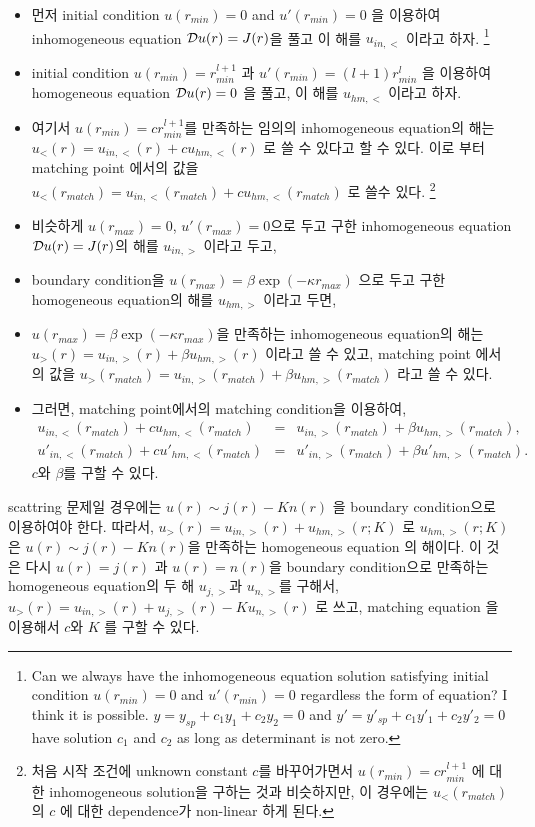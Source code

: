 \documentclass[10pt]{book}
\newcommand{\bea}{\begin{eqnarray}}
\newcommand{\eea}{\end{eqnarray}}
\newcommand{\no}{\nonumber \\}
\begin{document}
\begin{itemize}
\item  먼저 initial condition $u(r_{min})=0$ and $u'(r_{min})=0$ 을 이용하여 
       inhomogeneous equation ${\cal D}u(r)=J(r)$을 풀고 이 해를 $u_{in,<}$ 이라고 하자. 
       \footnote{ Can we always have the inhomogeneous equation solution 
       satisfying initial condition $u(r_{min})=0$ and $u'(r_{min})=0$ regardless 
       the form of equation? I think it is possible. 
       $y=y_{sp}+c_1 y_1+c_2 y_2=0$ and 
       $y'=y'_{sp}+c_1 y'_1+c_2 y'_2=0$ have solution $c_1$ and $c_2$
       as long as determinant is not zero.       
       } 
\item initial condition $u(r_{min})=r_{min}^{l+1}$ 과 $u'(r_{min})=(l+1)r_{min}^l$ 을 
      이용하여 homogeneous equation ${\cal D}u(r)=0$ 을 풀고, 이 해를 
      $u_{hm,<}$ 이라고 하자. 
\item 여기서 $u(r_{min})= c r_{min}^{l+1}$를 만족하는 임의의 inhomogeneous equation의 해는 
      $u_{<}(r)=u_{in,<}(r)+c u_{hm,<}(r)$ 로 쓸 수 있다고 할 수 있다.
      이로 부터 matching point 에서의 값을 
      $u_{<}(r_{match})=u_{in,<}(r_{match})+c u_{hm,<}(r_{match})$ 로 쓸수 있다.
      \footnote{ 처음 시작 조건에 unknown constant $c$를 바꾸어가면서 
      $u(r_{min})= c r_{min}^{l+1}$ 에 대한 inhomogeneous solution을 구하는 것과 비슷하지만,
      이 경우에는 $u_{<}(r_{match})$ 의 $c$ 에 대한 dependence가 non-linear 하게 된다. 
      } 
\item 비슷하게 $u(r_{max})=0$, $u'(r_{max})=0$으로 두고 구한 inhomogeneous equation        
      ${\cal D}u(r)=J(r)$의 해를 $u_{in,>}$ 이라고 두고,
\item boundary condition을 $u(r_{max})= \beta \exp(-\kappa r_{max})$ 으로 두고 
      구한 homogeneous equation의 해를 $u_{hm,>}$ 이라고 두면,
\item $u(r_{max})= \beta \exp(-\kappa r_{max})$을 만족하는 
      inhomogeneous equation의 해는 
      $u_{>}(r)=u_{in,>}(r)+\beta u_{hm,>}(r)$ 이라고 쓸 수 있고,
      matching point 에서의 값을 
      $u_{>}(r_{match})=u_{in,>}(r_{match})+\beta u_{hm,>}(r_{match})$
      라고 쓸 수 있다. 
\item 그러면, matching point에서의 matching condition을 이용하여,
     \bea 
     u_{in,<}(r_{match})+c u_{hm,<}(r_{match})&=&u_{in,>}(r_{match})+\beta u_{hm,>}(r_{match}),\no 
     u'_{in,<}(r_{match})+c u'_{hm,<}(r_{match})&=&u'_{in,>}(r_{match})+\beta u'_{hm,>}(r_{match}).
     \eea 
     $c$와 $\beta$를 구할 수 있다.                     
\end{itemize}
scattring 문제일 경우에는 $u(r)\sim j(r)-K n(r)$ 을 boundary condition으로 이용하여야 한다. 
따라서, $u_{>}(r)=u_{in,>}(r)+u_{hm,>}(r;K)$ 로   $u_{hm,>}(r;K)$ 은 
$u(r)\sim j(r)-K n(r)$을 만족하는 homogeneous equation 의 해이다. 이 것은 다시 
$u(r)=j(r)$ 과 $u(r)=n(r)$을 boundary condition으로 만족하는 homogeneous equation의 두 해  
$u_{j,>}$과 $u_{n,>}$를 구해서, $u_{>}(r)=u_{in,>}(r)+u_{j,>}(r)-K u_{n,>}(r)$ 로 쓰고,
matching equation 을 이용해서 $c$와 $K$ 를 구할 수 있다. 
\end{document}
